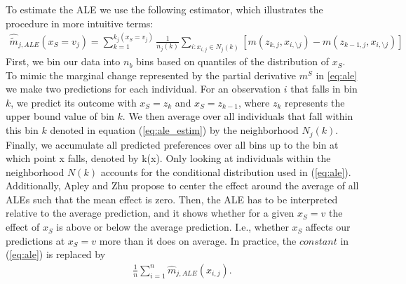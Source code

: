 To estimate the ALE we use the following estimator, which illustrates the procedure in more intuitive terms: 
\begin{align}
    \hat{\tilde{m}}_{j, ALE}(x_S=v_j)=\sum_{k=1}^{k_j(x_S=v_j)} \frac{1}{n_j(k)}\sum_{i:x_{i,j}\in N_j(k)}[m(z_{k,j}, x_{i,\setminus j})-m(z_{k-1,j}, x_{i,\setminus j})] \label{eq:ale_estim}
\end{align}
First, we bin our data into $n_b$ bins based on quantiles of the distribution of $x_S$. To mimic the marginal change represented by the partial derivative $m^S$ in \ref{eq:ale} we make two predictions for each individual. For an observation $i$ that falls in bin $k$, we predict its outcome with $x_S=z_k$ and $x_S=z_{k-1}$, where $z_k$ represents the upper bound value of bin $k$. We then average over all individuals that fall within this bin $k$ denoted in equation (\ref{eq:ale_estim}) by the neighborhood $N_j(k)$. Finally, we accumulate all predicted preferences over all bins up to the bin at which point x falls, denoted by k(x). Only looking at individuals within the neighborhood $N(k)$ accounts for the conditional distribution used in (\ref{eq:ale}). \\
Additionally, Apley and Zhu propose to center the effect around the average of all ALEs such that the mean effect is zero. Then, the ALE has to be interpreted relative to the average prediction, and it shows whether for a given $x_S=v$ the effect of $x_S$ is above or below the average prediction. I.e., whether $x_S$ affects our predictions at $x_S=v$ more than it does on average. In practice, the $constant$ in (\ref{eq:ale}) is replaced by 
\begin{align*}
    \frac{1}{n}\sum_{i=1}^n \hat{m}_{j, ALE}(x_{i, j}).
\end{align*}
